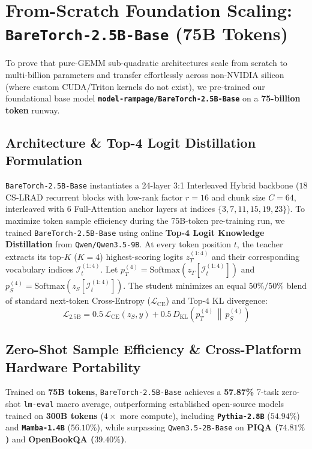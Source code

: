 \documentclass[twocolumn,10pt]{article}
\begin{document}
\section{From-Scratch Foundation Scaling: \texttt{BareTorch-2.5B-Base} (75B Tokens)}
To prove that pure-GEMM sub-quadratic architectures scale from scratch to multi-billion parameters and transfer effortlessly across non-NVIDIA silicon (where custom CUDA/Triton kernels do not exist), we pre-trained our foundational base model \textbf{\texttt{model-rampage/BareTorch-2.5B-Base}} on a \textbf{75-billion token} runway.

\subsection{Architecture \& Top-4 Logit Distillation Formulation}
\texttt{BareTorch-2.5B-Base} instantiates a 24-layer 3:1 Interleaved Hybrid backbone ($18$ CS-LRAD recurrent blocks with low-rank factor $r=16$ and chunk size $C=64$, interleaved with $6$ Full-Attention anchor layers at indices $\{3, 7, 11, 15, 19, 23\}$). To maximize token sample efficiency during the 75B-token pre-training run, we trained \texttt{BareTorch-2.5B-Base} using online \textbf{Top-4 Logit Knowledge Distillation} from \texttt{Qwen/Qwen3.5-9B}. At every token position $t$, the teacher extracts its top-$K$ ($K=4$) highest-scoring logits $z_T^{(1:4)}$ and their corresponding vocabulary indices $\mathcal{I}_t^{(1:4)}$. Let $p_T^{(4)} = \text{Softmax}(z_T[\mathcal{I}_t^{(1:4)}])$ and $p_S^{(4)} = \text{Softmax}(z_S[\mathcal{I}_t^{(1:4)}])$. The student minimizes an equal $50\% / 50\%$ blend of standard next-token Cross-Entropy ($\mathcal{L}_{\text{CE}}$) and Top-4 KL divergence:
\begin{equation}
\mathcal{L}_{\text{2.5B}} = 0.5 \, \mathcal{L}_{\text{CE}}(z_S, y) + 0.5 \, D_{\text{KL}}\!\left(p_T^{(4)} \,\middle\|\, p_S^{(4)}\right)
\end{equation}

\subsection{Zero-Shot Sample Efficiency \& Cross-Platform Hardware Portability}
Trained on \textbf{75B tokens}, \texttt{BareTorch-2.5B-Base} achieves a \textbf{57.87\%} 7-task zero-shot \texttt{lm-eval} macro average, outperforming established open-source models trained on \textbf{300B tokens} ($4\times$ more compute), including \textbf{\texttt{Pythia-2.8B}} ($54.94\%$) and \textbf{\texttt{Mamba-1.4B}} ($56.10\%$), while surpassing \texttt{Qwen3.5-2B-Base} on \textbf{PIQA ($74.81\%$)} and \textbf{OpenBookQA ($39.40\%$)}.
\end{document}
